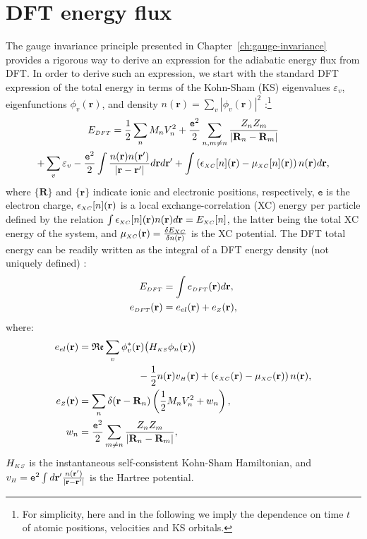 \section{DFT energy flux}  \label{sec:dft-heat-theory}
The gauge invariance principle presented in Chapter~\ref{ch:gauge-invariance} provides a rigorous way to derive an expression for the adiabatic energy flux from DFT.
In order to derive such an expression, we start with the standard DFT expression of the total energy in terms of the Kohn-Sham (KS) eigenvalues $\varepsilon_v$, eigenfunctions $\phi_v(\mathbf{r})$, and density $n(\mathbf{r}) = \sum_v |\phi_v(\mathbf{r})|^2$ \cite{Martin2008}:\footnote{For simplicity, here and in the following we imply the dependence on time $t$ of atomic positions, velocities and KS orbitals.}
\begin{multline}
  E_{{\scriptscriptstyle DFT}} = \frac{1}{2}\sum_{n}M_{n}V_{n}^{2} + \frac{\mathtt{e}^2}{2}\sum_{n,m\ne n}\frac{ Z_{n}Z_{m}}{|\mathbf{R}_{n}-\mathbf{R}_{m}|} \\
  + \sum_{v}\varepsilon_{v}-\frac{\mathtt{e}^2}{2}\int\frac{n(\mathbf{r})n(\mathbf{r}')}{|\mathbf{r}-\mathbf{r}'|}d\mathbf{r}d\mathbf{r}'+\int\left(\epsilon_{{\scriptscriptstyle XC}}[n](\mathbf{r})-\mu_{{\scriptscriptstyle XC}}[n](\mathbf{r})\right)n(\mathbf{r})d\mathbf{r},
\end{multline}
where $\{\mathbf{R}\}$ and $\{\mathbf{r}\}$ indicate ionic and electronic positions, respectively, $\mathtt{e}$ is the electron charge, $\epsilon_{\scriptscriptstyle XC}[n](\mathbf{r})$ is a local exchange-correlation (XC) energy per particle defined by the relation $ \int \epsilon_{\scriptscriptstyle XC}[n](\mathbf{r})n(\mathbf{r}) d\mathbf{r}=E_{\scriptscriptstyle XC} [n]$, the latter being the total XC energy of the system, and $ \mu_{\scriptscriptstyle XC} (\mathbf{r}) = \frac{\delta E_{\scriptscriptstyle XC} }{\delta n(\mathbf{r})}$ is the XC potential. The DFT total energy can be readily written as the integral of a DFT energy density (not uniquely defined) \cite{Chetty1992}:
\begin{align}
    E_{\smallDFT} & =  \int e_{\smallDFT}(\mathbf{r})d\mathbf{r}, \nonumber\\
    e_{\smallDFT}(\mathbf{r}) & = e_{el}(\mathbf{r})+e_{\smallZ}(\mathbf{r}), \label{eq:DFT-Edensity}
\end{align}
where:
\begin{align}
  e_{el}(\mathbf{r}) & =\mathfrak{Re} \sum_{v}\phi_{v}^{*}(\mathbf{r})\bigl(H_{\smallKS}\phi_{n}(\mathbf{r})\bigr) \nonumber \\
  & \qquad\qquad\qquad - \frac{1}{2}n(\mathbf{r})v_{\smallH}(\mathbf{r}) +\left(\epsilon_\smallXC (\mathbf{r}) - \mu_\smallXC  (\mathbf{r}) \right) n(\mathbf{r}), \\
  e_{\smallZ}(\mathbf{r}) & = \sum_{n}\delta(\mathbf{r}-\mathbf{R}_{n}) \left(\frac{1}{2}M_{n}V_{n}^{2}+w_{n}\right), \\
  w_{n} & =\frac{\mathtt{e}^2}{2}\sum_{m\ne n}\frac{ Z_{n}Z_{m}}{|\mathbf{R}_{n}-\mathbf{R}_{m}|}, \label{eq:DFT-Edensity-breakup}
\end{align}
$H_{\scriptscriptstyle KS}$ is the instantaneous self-consistent Kohn-Sham Hamiltonian, and $v_{\scriptscriptstyle H} = \mathtt{e}^2 \int d\mathbf{r}' \frac{n(\mathbf{r}')}{|\mathbf{r}-\mathbf{r}'|}$ is the Hartree potential. 

